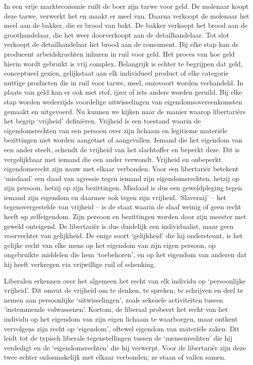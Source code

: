 \documentclass[
  a5paper,
  smalldemyvopaper,10pt,twoside,onecolumn,openright,extrafontsizes,hidelinks]{memoir}
\begin{document}
In een vrije markteconomie ruilt de boer zijn tarwe voor geld. De
molenaar koopt deze tarwe, verwerkt het en maakt er meel van. Daarna
verkoopt de molenaar het meel aan de bakker, die er brood van bakt. De
bakker verkoopt het brood aan de groothandelaar, die het weer
doorverkoopt aan de detailhandelaar. Tot slot verkoopt de
detailhandelaar het brood aan de consument. Bij elke stap kan de
producent arbeidskrachten inhuren in ruil voor geld. Het proces van hoe
geld hierin wordt gebruikt is vrij complex. Belangrijk is echter te
begrijpen dat geld, conceptueel gezien, gelijkstaat aan elk individueel
product of elke categorie nuttige producten die in ruil voor tarwe,
meel, enzovoort worden verhandeld. In plaats van geld kan er ook met
stof, ijzer of iets anders worden geruild. Bij elke stap worden
wederzijds voordelige uitwisselingen van eigendomsovereenkomsten gemaakt
en uitgevoerd. Nu kunnen we kijken naar de manier waarop libertariërs
het begrip `vrijheid' definiëren. Vrijheid is een toestand waarin de
eigendomsrechten van een persoon over zijn lichaam en legitieme
materiële bezittingen niet worden aangetast of aangevallen. Iemand die
het eigendom van een ander steelt, schendt de vrijheid van het
slachtoffer en beperkt deze. Dit is vergelijkbaar met iemand die een
ander verwondt. Vrijheid en onbeperkt eigendomsrecht zijn nauw met
elkaar verbonden. Voor een libertariër betekent `misdaad' een daad van
agressie tegen iemand zijn eigendomsrechten, hetzij op zijn persoon,
hetzij op zijn bezittingen. Misdaad is dus een geweldpleging tegen
iemand zijn eigendom en daarmee ook tegen zijn vrijheid. `Slavernij' --
het tegenovergestelde van vrijheid -- is de staat waarin de slaaf weinig
of geen recht heeft op zelfeigendom. Zijn persoon en bezittingen worden
door zijn meester met geweld onteigend. De libertariër is dus duidelijk
een individualist, maar geen voorvechter van gelijkheid. De enige soort
`gelijkheid' die hij ondersteunt, is het gelijke recht van elke mens op
het eigendom van zijn eigen persoon, op ongebruikte middelen die hem
`toebehoren', en op het eigendom van anderen dat hij heeft verkregen via
vrijwillige ruil of schenking.

Liberalen erkennen over het algemeen het recht van elk individu op
`persoonlijke vrijheid'. Dit omvat de vrijheid om te denken, te spreken,
te schrijven en deel te nemen aan persoonlijke `uitwisselingen', zoals
seksuele activiteiten tussen `instemmende volwassenen'. Kortom, de
liberaal probeert het recht van het individu op het eigendom van zijn
eigen lichaam te waarborgen, maar ontkent vervolgens zijn recht op
`eigendom', oftewel eigendom van materiële zaken. Dit leidt tot de
typisch liberale tegenstellingen tussen de `mensenrechten' die hij
verdedigt en de `eigendomsrechten' die hij verwerpt. Voor de libertariër
zijn deze twee echter onlosmakelijk met elkaar verbonden; ze staan of
vallen samen.
\end{document}
